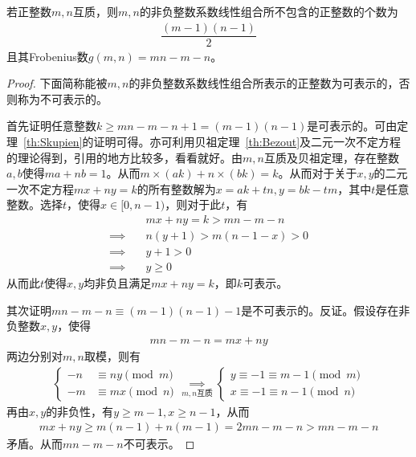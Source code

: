 \begin{theorem}
  若正整数$m,n$互质，则$m,n$的非负整数系数线性组合所不包含的正整数的个数为
  \begin{align*}
    \dfrac{(m-1)(n-1)}2
  \end{align*}
  且其Frobenius数$g(m,n)=mn-m-n$。
\end{theorem}
\begin{proof}下面简称能被$m,n$的非负整数系数线性组合所表示的正整数为可表示的，否则称为不可表示的。
  
  首先证明任意整数$k\ge mn-m-n+1=(m-1)(n-1)$是可表示的。可由定理~\ref{th:Skupien}的证明可得。亦可利用贝祖定理~\ref{th:Bezout}及二元一次不定方程的理论得到，引用的地方比较多，看看就好。由$m,n$互质及贝祖定理，存在整数$a,b$使得$ma+nb=1$。从而$m\times(ak)+n\times(bk)=k$。从而对于关于$x,y$的二元一次不定方程$mx+ny=k$的所有整数解为$x=ak+tn, y=bk-tm$，其中$t$是任意整数。选择$t$，使得$x\in[0,n-1)$，则对于此$t$，有
  \begin{align*}
    &mx + ny = k > mn -m -n \\
    \implies\quad& n(y+1)>m(n-1-x)>0\\
                                            \implies\quad&y+1>0\\
    \implies\quad& y\ge0    
  \end{align*}
  从而此$t$使得$x,y$均非负且满足$mx+ny=k$，即$k$可表示。


  其次证明$mn-m-n\equiv (m-1)(n-1)-1$是不可表示的。反证。假设存在非负整数$x,y$，使得
  \begin{align*}
    mn-m-n=mx+ny
  \end{align*}
  两边分别对$m,n$取模，则有
  \begin{align*}
    \begin{cases}
      -n&\equiv ny\pmod m\\
      -m&\equiv mx\pmod n
    \end{cases}
    \underset{m,n\text{互质}}{\implies}
    \begin{cases}
      y\equiv -1\equiv m-1 \pmod m\\
      x\equiv -1\equiv n-1 \pmod n
    \end{cases}
  \end{align*}
  再由$x,y$的非负性，有$y\ge m-1, x\ge n-1$，从而
  \begin{align*}
    mx + ny\ge m(n-1) + n(m-1) = 2mn -m -n > mn - m -n
  \end{align*}
  矛盾。从而$mn-m-n$不可表示。


\end{proof}
